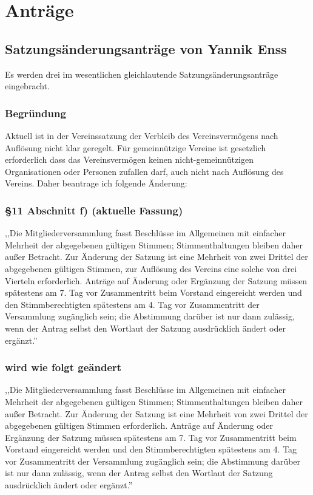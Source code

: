\documentclass[a4paper]{scrartcl}
\begin{document}
\clearpage
\section{Anträge}

\subsection{Satzungsänderungsanträge von Yannik Enss}

Es werden drei im wesentlichen gleichlautende Satzungsänderungsanträge eingebracht.

\subsubsection{Begründung}

Aktuell ist in der Vereinssatzung der Verbleib des Vereinsvermögens nach Auflösung nicht klar geregelt. Für gemeinnützige Vereine ist gesetzlich erforderlich dass das Vereinsvermögen keinen nicht-gemeinnützigen Organisationen oder Personen zufallen darf, auch nicht nach Auflösung des Vereins.
Daher beantrage ich folgende Änderung:

\subsubsection{§11 Abschnitt f) (aktuelle Fassung)}

,,Die Mitgliederversammlung fasst Beschlüsse im Allgemeinen mit einfacher Mehrheit der abgegebenen gültigen Stimmen; Stimmenthaltungen bleiben daher außer Betracht. Zur Änderung der Satzung ist eine Mehrheit von zwei Drittel der abgegebenen gültigen Stimmen, zur Auflösung des Vereins eine solche von drei Vierteln erforderlich. Anträge auf Änderung oder Ergänzung der Satzung müssen spätestens am 7. Tag vor Zusammentritt beim Vorstand eingereicht werden und den Stimmberechtigten spätestens am 4. Tag vor Zusammentritt der Versammlung zugänglich sein; die Abstimmung darüber ist nur dann zulässig, wenn der Antrag selbst den Wortlaut der Satzung ausdrücklich ändert oder ergänzt.''

\subsubsection{wird wie folgt geändert}

,,Die Mitgliederversammlung fasst Beschlüsse im Allgemeinen mit einfacher Mehrheit der abgegebenen gültigen Stimmen; Stimmenthaltungen bleiben daher außer Betracht. Zur Änderung der Satzung ist eine Mehrheit von zwei Drittel der abgegebenen gültigen Stimmen erforderlich. Anträge auf Änderung oder Ergänzung der Satzung müssen spätestens am 7. Tag vor Zusammentritt beim Vorstand eingereicht werden und den Stimmberechtigten spätestens am 4. Tag vor Zusammentritt der Versammlung zugänglich sein; die Abstimmung darüber ist nur dann zulässig, wenn der Antrag selbst den Wortlaut der Satzung ausdrücklich ändert oder ergänzt.''
\end{document}
